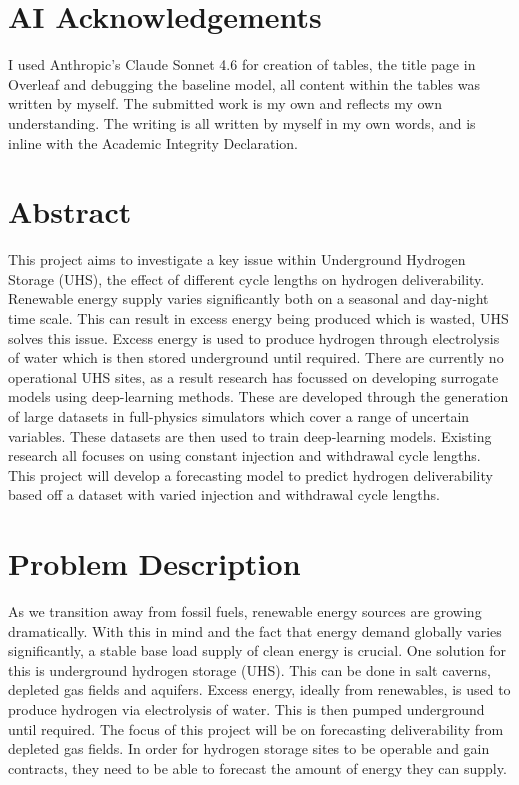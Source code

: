 \documentclass[12pt]{article}
\begin{document}
\section{AI Acknowledgements}
I used Anthropic's Claude Sonnet 4.6 for creation of tables, the title page in Overleaf and debugging the baseline model, all content within the tables was written by myself. The submitted work is my own and reflects my own understanding. The writing is all written by myself in my own words, and is inline with the Academic Integrity Declaration.

\section{Abstract}
This project aims to investigate a key issue within Underground Hydrogen Storage (UHS), the effect of different cycle lengths on hydrogen deliverability. Renewable energy supply varies significantly both on a seasonal and day-night time scale. This can result in excess energy being produced which is wasted, UHS solves this issue. Excess energy is used to produce hydrogen through electrolysis of water which is then stored underground until required. There are currently no operational UHS sites, as a result research has focussed on developing surrogate models using deep-learning methods. These are developed through the generation of large datasets in full-physics simulators which cover a range of uncertain variables. These datasets are then used to train deep-learning models. Existing research all focuses on using constant injection and withdrawal cycle lengths. This project will develop a forecasting model to predict hydrogen deliverability based off a dataset with varied injection and withdrawal cycle lengths.       

\section{Problem Description}
As we transition away from fossil fuels, renewable energy sources are growing dramatically. With this in mind and the fact that energy demand globally varies significantly, a stable base load supply of clean energy is crucial. One solution for this is underground hydrogen storage (UHS). This can be done in salt caverns, depleted gas fields and aquifers. Excess energy, ideally from renewables, is used to produce hydrogen via electrolysis of water. This is then pumped underground until required. The focus of this project will be on forecasting deliverability from depleted gas fields. In order for hydrogen storage sites to be operable and gain contracts, they need to be able to forecast the amount of energy they can supply.
\end{document}
